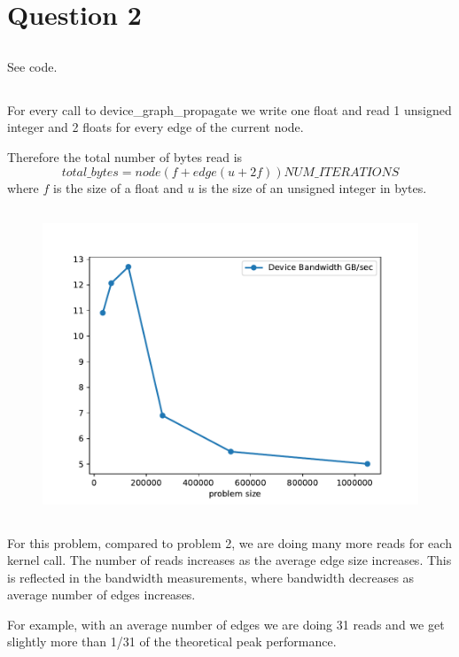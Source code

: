 \section{Question 2}
\subsection{}
See code.

\subsection{}
For every call to device\_graph\_propagate we write one float and read 1 unsigned integer and 2 floats for every edge of the current node.

Therefore the total number of bytes read is
\begin{equation}
total\_bytes = node(f + edge(u+2f))NUM\_ITERATIONS
\end{equation}
where $f$ is the size of a float and $u$ is the size of an unsigned integer in bytes.


\subsection{}
\begin{figure}[!ht]
	\centering
\includegraphics[scale=0.65]{graph.pdf}
\end{figure}

\subsection{}
For this problem, compared to problem 2, we are doing many more reads for each kernel call. The number of reads increases as the average edge size increases. This is reflected in the bandwidth measurements, where bandwidth decreases as average number of edges increases.

For example, with an average number of edges we are doing 31 reads and we get slightly more than 1/31 of the theoretical peak performance.

\tiny{}
